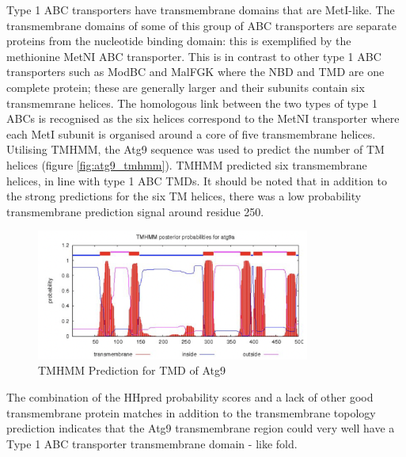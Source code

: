 Type 1 ABC transporters have transmembrane domains that are MetI-like.  The transmembrane domains of some of this group of ABC transporters are separate proteins \cite{kadaba2008high} from the nucleotide binding domain: this is exemplified by the methionine MetNI ABC transporter. This is in contrast to other type 1 ABC transporters such as ModBC and MalFGK where the NBD and TMD are one complete protein; these are generally larger and their subunits contain six transmemrane helices.  The homologous link between the two types of type 1 ABCs is recognised as the six helices correspond to the MetNI transporter where each MetI subunit is organised around a core of five transmembrane helices.  Utilising TMHMM, the Atg9 sequence was used to predict the number of TM helices (figure \ref{fig:atg9_tmhmm}).   TMHMM predicted six transmembrane helices, in line with type 1 ABC TMDs.  It should be noted that in addition to the strong predictions for the six TM helices, there was a low probability transmembrane prediction signal around residue 250. 

\begin{figure}[th!]
    \centering
    \includegraphics[width=90mm, scale=0.9]{Modelling of Atg9/atg9_tmhmm.png}
    \caption{TMHMM Prediction for TMD of Atg9}
    \label{fig:atg9_tmhmm}
    \small
    \label{fig:tmhmm}
\end{figure}


The combination of the HHpred probability scores and a lack of other good transmembrane protein matches in addition to the transmembrane topology prediction indicates that the Atg9 transmembrane region could very well have a Type 1 ABC transporter transmembrane domain - like fold.




